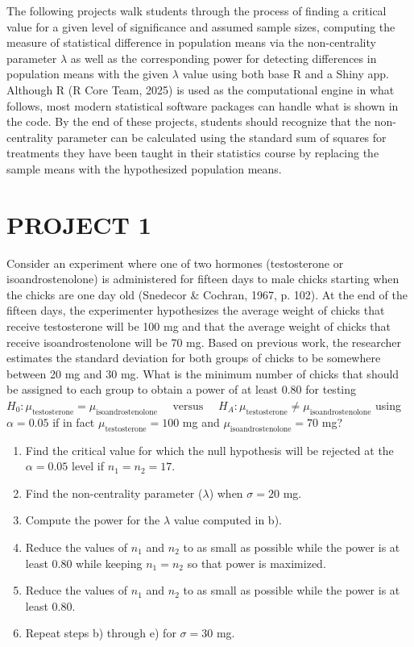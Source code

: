 \documentclass[
]{article}
\begin{document}
The following projects walk students through the process of finding a critical value for a given level of significance and assumed sample sizes, computing the measure of statistical difference in population means via the non-centrality parameter \(\lambda\) as well as the corresponding power for detecting differences in population means with the given \(\lambda\) value using both base R and a Shiny app. Although R (R Core Team, 2025) is used as the computational engine in what follows, most modern statistical software packages can handle what is shown in the code. By the end of these projects, students should recognize that the non-centrality parameter can be calculated using the standard sum of squares for treatments they have been taught in their statistics course by replacing the sample means with the hypothesized population means.

\section*{PROJECT 1}\label{project-1}

Consider an experiment where one of two hormones (testosterone or isoandrostenolone) is administered for fifteen days to male chicks starting when the chicks are one day old (Snedecor \& Cochran, 1967, p. 102). At the end of the fifteen days, the experimenter hypothesizes the average weight of chicks that receive testosterone will be 100 mg and that the average weight of chicks that receive isoandrostenolone will be 70 mg. Based on previous work, the researcher estimates the standard deviation for both groups of chicks to be somewhere between 20 mg and 30 mg. What is the minimum number of chicks that should be assigned to each group to obtain a power of at least 0.80 for testing \(H_0: \mu_\text{testosterone} = \mu_\text{isoandrostenolone}\quad\text{ versus }\quad H_A: \mu_\text{testosterone} \neq \mu_\text{isoandrostenolone}\) using \(\alpha = 0.05\) if in fact \(\mu_\text{testosterone} = 100\) mg and \(\mu_\text{isoandrostenolone} = 70\) mg?

\begin{enumerate}
\def\labelenumi{\alph{enumi})}
\item
  Find the critical value for which the null hypothesis will be rejected at the \(\alpha = 0.05\) level if \(n_1=n_2 = 17\).
\item
  Find the non-centrality parameter (\(\lambda\)) when \(\sigma = 20\) mg.
\item
  Compute the power for the \(\lambda\) value computed in b).
\item
  Reduce the values of \(n_1\) and \(n_2\) to as small as possible while the power is at least 0.80 while keeping \(n_1 = n_2\) so that power is maximized.
\item
  Reduce the values of \(n_1\) and \(n_2\) to as small as possible while the power is at least 0.80.
\item
  Repeat steps b) through e) for \(\sigma = 30\) mg.
\end{enumerate}
\end{document}
